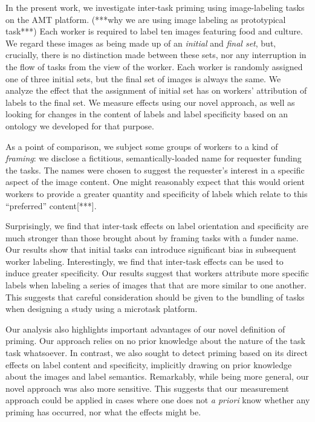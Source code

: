 \documentclass[a4paper]{report}
\begin{document}
In the present work, we investigate inter-task priming using image-labeling 
tasks on the AMT platform.  
(***why we are using image labeling as prototypical task***) 
Each worker is required to label ten images 
featuring 
food and culture.  We regard these images as being made up of an 
\textit{initial} and \textit{final set}, but, crucially, there is no
distinction made between these sets, nor any interruption in the flow of tasks 
from the view of the worker.
Each worker is randomly assigned one of three initial sets, but the final set
of images is always the same.  We analyze the effect that the assignment of 
initial set has on workers' attribution of labels to the final set.  We 
measure effects using our novel approach, as well as looking for changes in 
the content of labels and label specificity based on an ontology we 
developed for that purpose.

As a point of comparison, we subject some groups of workers to a kind of
\textit{framing}: we disclose a fictitious, semantically-loaded name for 
requester funding the tasks.
The names were chosen to suggest the requester's interest in 
a specific aspect of the image content.  One might reasonably expect that this 
would orient workers to provide a greater quantity and specificity of labels 
which relate to this ``preferred'' content[***].

Surprisingly, we find that inter-task effects on label orientation and 
specificity are much stronger than those brought about by framing tasks with a 
funder name.  Our results show that initial tasks can introduce significant 
bias in subsequent worker labeling.  Interestingly, we find that inter-task
effects can be used to induce greater specificity.  Our results suggest that
workers attribute more specific labels when labeling a series of images that
that are more similar to one another.  This suggests that careful 
consideration should be given to the bundling of tasks when designing a study 
using a microtask platform.

Our analysis also highlights important advantages of our novel definition of 
priming.  Our approach relies on no prior knowledge about the nature
of the task task whatsoever.  In contrast, we also sought to detect priming
based on its direct effects on label content and specificity, implicitly
drawing on prior knowledge about the images and label semantics.
Remarkably, while being more general, our novel approach was also more 
sensitive.  This suggests that our measurement approach could be applied in 
cases where one does not \emph{a priori} know whether any priming has occurred, 
nor what the effects might be.
\end{document}
